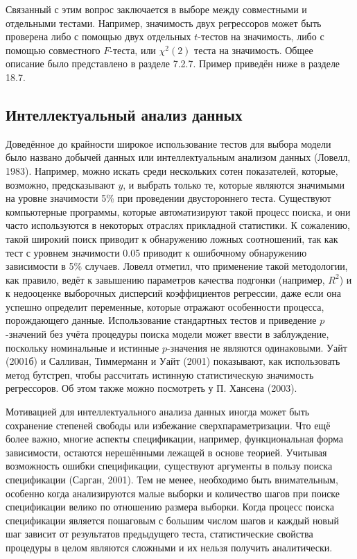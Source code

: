 Связанный с этим вопрос заключается в выборе между совместными и отдельными тестами. Например, значимость двух регрессоров может быть проверена либо с помощью двух отдельных $t$-тестов на значимость, либо с помощью совместного $F$-теста, или $\chi^2(2)$ теста на значимость. Общее описание было представлено в разделе 7.2.7. Пример приведён ниже в разделе 18.7.

\subsection{Интеллектуальный анализ данных}

Доведённое до крайности широкое использование тестов для выбора модели было названо добычей данных или интеллектуальным анализом данных (Ловелл, 1983). Например, можно искать среди нескольких сотен показателей, которые, возможно, предсказывают $y$, и выбрать только те, которые являются значимыми на уровне значимости 5\% при проведении двустороннего теста. Существуют компьютерные программы, которые автоматизируют такой процесс поиска, и они часто используются в некоторых отраслях прикладной статистики. К сожалению, такой широкий поиск приводит к обнаружению ложных соотношений, так как тест с уровнем значимости 0.05 приводит к ошибочному обнаружению зависимости в 5\% случаев. Ловелл отметил, что применение такой методологии, как правило, ведёт к завышению параметров качества подгонки (например, $R^2$) и к недооценке выборочных дисперсий коэффициентов регрессии, даже если она успешно определит переменные, которые отражают особенности процесса, порождающего данные. Использование стандартных тестов и приведение $p$-значений без учёта процедуры поиска модели может ввести в заблуждение, поскольку номинальные и истинные $p$-значения не являются одинаковыми. Уайт (2001б) и Салливан, Тиммерманн и Уайт (2001) показывают, как использовать метод бутстреп, чтобы рассчитать истинную статистическую значимость регрессоров. Об этом также можно посмотреть у П. Хансена (2003).

Мотивацией для интеллектуального анализа данных иногда может быть сохранение степеней свободы или избежание сверхпараметризации. Что ещё более важно, многие аспекты спецификации, например, функциональная форма зависимости, остаются нерешёнными лежащей в основе теорией. Учитывая возможность ошибки спецификации,  существуют аргументы в пользу поиска спецификации (Сарган, 2001). Тем не менее, необходимо быть внимательным, особенно когда анализируются малые выборки и количество шагов при поиске спецификации велико по отношению размера выборки. Когда процесс поиска спецификации является пошаговым с большим числом шагов и каждый новый шаг зависит от результатов предыдущего теста, статистические свойства процедуры в целом являются сложными и их нельзя получить аналитически.

